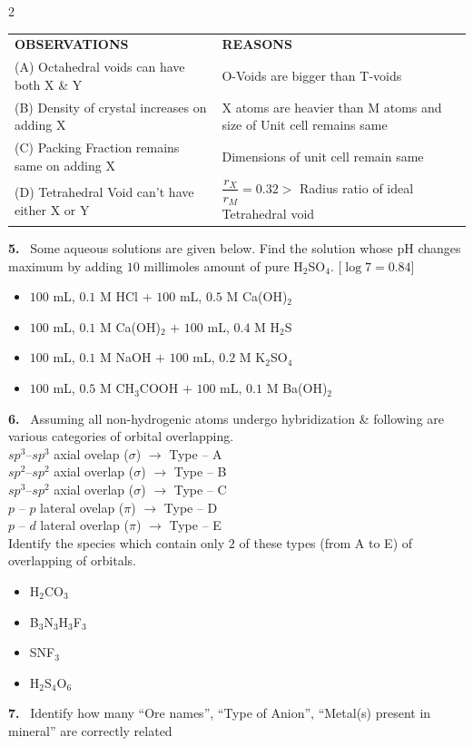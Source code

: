 \documentclass[10pt]{extarticle}
\newcommand{\qn}[1]{\par\smallskip\noindent\textbf{#1.}~}
\newenvironment{qoptions}{\begin{itemize}[leftmargin=1.8em,itemsep=1pt,topsep=2pt,label={}]}{\end{itemize}}
\newcommand{\opt}[2]{\item[(#1)] #2}
\begin{document}
\begin{multicols}{2}
\begin{center}\footnotesize\setlength{\tabcolsep}{3pt}
\begin{tabular}{@{}p{3.4cm}p{3.7cm}@{}}
\textbf{OBSERVATIONS} & \textbf{REASONS}\\
(A) Octahedral voids can have both X \& Y & O-Voids are bigger than T-voids\\
(B) Density of crystal increases on adding X & X atoms are heavier than M atoms and size of Unit cell remains same\\
(C) Packing Fraction remains same on adding X & Dimensions of unit cell remain same\\
(D) Tetrahedral Void can't have either X or Y & $\dfrac{r_X}{r_M}=0.32>$ Radius ratio of ideal Tetrahedral void
\end{tabular}
\end{center}
\qn{5} Some aqueous solutions are given below. Find the solution whose pH changes maximum by adding $10$ millimoles amount of pure H$_2$SO$_4$. [$\log7=0.84$]
\begin{qoptions}
\opt{A}{$100$ mL, $0.1$ M HCl $+$ $100$ mL, $0.5$ M Ca(OH)$_2$}
\opt{B}{$100$ mL, $0.1$ M Ca(OH)$_2$ $+$ $100$ mL, $0.4$ M H$_2$S}
\opt{C}{$100$ mL, $0.1$ M NaOH $+$ $100$ mL, $0.2$ M K$_2$SO$_4$}
\opt{D}{$100$ mL, $0.5$ M CH$_3$COOH $+$ $100$ mL, $0.1$ M Ba(OH)$_2$}
\end{qoptions}
\qn{6} Assuming all non-hydrogenic atoms undergo hybridization \& following are various categories of orbital overlapping.\\
$sp^3$--$sp^3$ axial ovelap ($\sigma$) $\longrightarrow$ Type -- A\\
$sp^2$--$sp^2$ axial overlap ($\sigma$) $\longrightarrow$ Type -- B\\
$sp^3$--$sp^2$ axial overlap ($\sigma$) $\longrightarrow$ Type -- C\\
$p$ -- $p$ lateral ovelap ($\pi$) $\longrightarrow$ Type -- D\\
$p$ -- $d$ lateral overlap ($\pi$) $\longrightarrow$ Type -- E\\
Identify the species which contain only $2$ of these types (from A to E) of overlapping of orbitals.
\begin{qoptions}
\opt{A}{H$_2$CO$_3$}
\opt{B}{B$_3$N$_3$H$_3$F$_3$}
\opt{C}{SNF$_3$}
\opt{D}{H$_2$S$_4$O$_6$}
\end{qoptions}
\qn{7} Identify how many ``Ore names'', ``Type of Anion'', ``Metal(s) present in mineral'' are correctly related


\end{multicols}
\end{document}

